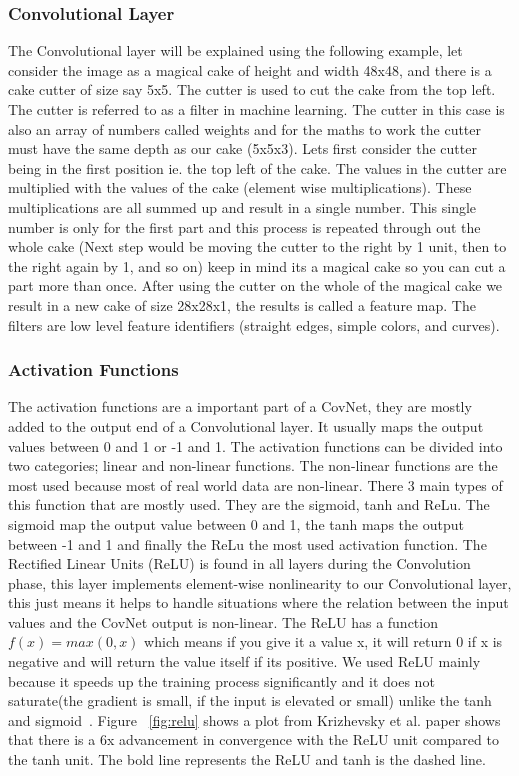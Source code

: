 \documentclass[12pt, a4paper,oneside]{report}
\begin{document}
\subsubsection{Convolutional Layer}
The Convolutional layer will be explained using the following example, let consider the image as a magical cake of height and width 48x48, and there is a cake cutter of size say 5x5. The cutter is used to cut the cake from the top left. The cutter is referred to as a filter in machine learning. The cutter in this case is also an array of numbers called weights and for the maths to work the cutter must have the same depth as our cake (5x5x3).
Lets first consider the cutter being in the first position ie. the top left of the cake. The values in the cutter are multiplied with the values of the cake (element wise multiplications). These multiplications are all summed up and result in a single number. This single number is only for the first part and this process is repeated through out the whole cake (Next step would be moving the cutter to the right by 1 unit, then to the right again by 1, and so on) keep in mind its a magical cake so you can cut a part more than once. After using the cutter on the whole of the magical cake we result in a new cake of size 28x28x1, the results is called a feature map. The filters are low level feature identifiers (straight edges, simple colors, and curves). 


\subsubsection{Activation Functions}
The activation functions are a important part of a CovNet, they are mostly added to the output end of a Convolutional layer. It usually maps the output values between 0 and 1 or -1 and 1. The activation functions can be divided into two categories; linear and non-linear functions. The non-linear functions are the most used because most of real world data are non-linear. There 3 main types of this function that are mostly used. They are the sigmoid, tanh and ReLu. The sigmoid map the output value between 0 and 1, the tanh maps the output between -1 and 1 and finally the ReLu the most used activation function. The Rectified Linear Units (ReLU) is found in all layers during the Convolution phase, this layer implements element-wise nonlinearity to our Convolutional layer, this just means it helps to handle situations where the relation between the input values and the CovNet output is non-linear. The ReLU has a function \(f(x) = max(0,x)\) which means if you give it a value x, it will return 0 if x is negative and will return the value itself if its positive. We used ReLU mainly because it speeds up the training process significantly and it does not saturate(the gradient is small, if the input is elevated or small) unlike the tanh and sigmoid~\cite{relu}. Figure ~\ref{fig:relu} shows a plot from Krizhevsky et al. \cite{krizhevsky2012imagenet} paper shows that there is a 6x advancement in convergence with the ReLU unit compared to the tanh unit. The bold line represents the ReLU and tanh is the dashed line.
\end{document}
